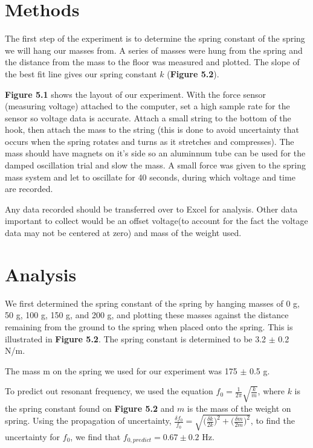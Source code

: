 \documentclass[11pt]{report}
\begin{document}
\section*{Methods}


The first step of the experiment is to determine the spring constant of the
spring we will hang our masses from.  A series of masses were hung from the
spring and the distance from the mass to the floor was measured and plotted.
The slope of the best fit line gives our spring constant \(k\) (\textbf{Figure
5.2}). 

\textbf{Figure 5.1} shows the layout of our experiment. 
With the force sensor (measuring voltage) attached to the computer, set a high sample
rate for the sensor so voltage data is accurate.  Attach a small string to the
bottom of the hook, then attach the mass to the string (this is done to avoid
uncertainty that occurs when the spring rotates and turns as it stretches and
compresses).  The mass should have magnets on it's side so an aluminnum tube can
be used for the damped oscillation trial and slow the mass.  A small force was
given to the spring mass system and let to oscillate for 40 seconds, during
which voltage and time are recorded.    

Any data recorded should be transferred over to Excel for analysis.  Other data
important to collect would be an offset voltage(to account for the fact the
voltage data may not be centered at zero) and mass of the weight used.  

\section*{Analysis}
We first determined the spring constant of the spring by hanging masses of 0 g, 50 g,
100 g, 150 g, and 200 g, and plotting these masses against the distance
remaining from the ground to the spring when placed onto the spring.  This is
illustrated in \textbf{Figure 5.2}.  The spring constant is determined to be
3.2 $\pm$ 0.2 N/m.

The mass m on the spring we used for our experiment was 175 $\pm$ 0.5 g.  

To predict out resonant frequency, we used the equation \(f_0 =
\frac{1}{2\pi}\sqrt{\frac{k}{m}}\), where \(k\) is the spring constant found on
\textbf{Figure 5.2} and \(m\) is the mass of the weight on spring.  Using the
propagation of uncertainty, \(\frac{\delta f_0}{f_0} =
\sqrt{\bigg(\frac{\delta k}{2k} \bigg)^2 + \bigg(\frac{\delta m}{2m} \bigg)^2}
\), to find the uncertainty for \(f_0\), we find that \(f_{0, predict} = 0.67
\pm 0.2\) Hz. 
\end{document}
